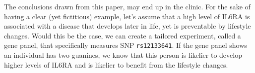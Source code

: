 The conclusions drawn from this paper,
may end up in the clinic.
For the sake of having a clear (yet fictitious) example,
let's assume that a high level of IL6RA 
is associated with a disease that develops later in life,
yet is preventable by lifestyle changes.
Would this be the case, we can create a tailored 
experiment, called a gene panel, that specifically measures
SNP \verb|rs12133641|. 
If the gene panel shows an individual has two guanines, 
we know that this person is likelier to develop higher levels of
IL6RA and is likelier to benefit from the lifestyle changes.

